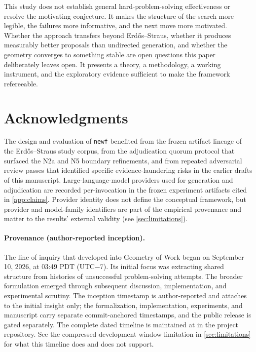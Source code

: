 \documentclass[11pt]{article}
\theoremstyle{gowthm}
\theoremstyle{gowplain}
\begin{document}
This study does not establish general hard-problem-solving effectiveness or
resolve the motivating conjecture. It makes the structure of the search more
legible, the failures more informative, and the next move more motivated.
Whether the approach transfers beyond Erd\H{o}s--Straus, whether it produces
measurably better proposals than undirected generation, and whether the geometry
converges to something stable are open questions this paper deliberately leaves
open. It presents a theory, a methodology, a working instrument, and the
exploratory evidence sufficient to make the framework refereeable.

\section*{Acknowledgments}
The design and evaluation of \texttt{newf} benefited from the frozen artifact
lineage of the Erd\H{o}s--Straus study corpus, from the adjudication quorum
protocol that surfaced the N2a and N5 boundary refinements, and from repeated
adversarial review passes that identified specific evidence-laundering risks
in the earlier drafts of this manuscript. Large-language-model providers used
for generation and adjudication are recorded per-invocation in the frozen
experiment artifacts cited in \cref{app:claims}. Provider identity does not
define the conceptual framework, but provider and model-family identifiers
are part of the empirical provenance and matter to the results' external
validity (see \cref{sec:limitations}).

\paragraph{Provenance (author-reported inception).} The line of inquiry that
developed into Geometry of Work began on September 10, 2026, at 03:49 PDT
(UTC$-$7). Its initial focus was extracting shared structure from histories
of unsuccessful problem-solving attempts. The broader formulation emerged
through subsequent discussion, implementation, and experimental scrutiny.
The inception timestamp is author-reported and attaches to the initial
insight only; the formalization, implementation, experiments, and manuscript
carry separate commit-anchored timestamps, and the public release is gated
separately. The complete dated timeline is maintained at
 in the project repository. See the compressed
development window limitation in \cref{sec:limitations} for what this
timeline does and does not support.
\end{document}
